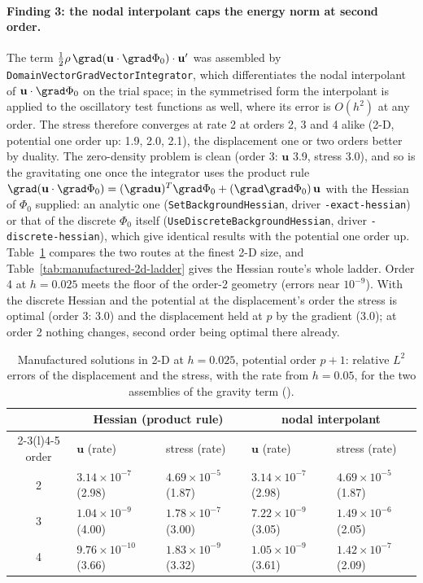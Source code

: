 \documentclass[11pt]{article}
\numberwithin{equation}{section}
\newcommand{\vu}{\mathbf{u}}
\newcommand{\code}[1]{\texttt{#1}}
\begin{document}
\paragraph{Finding 3: the nodal interpolant caps the energy norm at second
order.} The term $\tfrac12\rho\,\grad(\vu\cdot\grad\Phi_0)\cdot\vu'$ was
assembled by \code{DomainVectorGradVectorIntegrator}, which differentiates
the nodal interpolant of $\vu\cdot\grad\Phi_0$ on the trial space; in the
symmetrised form the interpolant is applied to the oscillatory test
functions as well, where its error is $O(h^2)$ at any order. The stress
therefore converges at rate 2 at orders 2, 3 and 4 alike (2-D, potential one
order up: 1.9, 2.0, 2.1), the displacement one or two orders better by
duality. The zero-density problem is clean (order 3: $\vu$ 3.9, stress
3.0), and so is the gravitating one once the integrator uses the product
rule $\grad(\vu\cdot\grad\Phi_0) = (\grad\vu)^T\grad\Phi_0 +
(\grad\grad\Phi_0)\,\vu$ with the Hessian of $\Phi_0$ supplied: an analytic
one (\code{SetBackgroundHessian}, driver \code{-exact-hessian}) or that of
the discrete $\Phi_0$ itself (\code{UseDiscreteBackgroundHessian}, driver
\code{-discrete-hessian}), which give identical results with the potential
one order up. Table~\ref{tab:manufactured-2d} compares the two routes at
the finest 2-D size, and Table~\ref{tab:manufactured-2d-ladder} gives the
Hessian route's whole ladder. Order 4 at $h=0.025$ meets the floor of the
order-2 geometry (errors near $10^{-9}$). With the discrete Hessian and the
potential at the displacement's order the stress is optimal (order 3: 3.0)
and the displacement held at $p$ by the gradient (3.0); at order 2 nothing
changes, second order being optimal there already.
\begin{table}[tp]
\centering
\small
\begin{tabular}{@{}cllll@{}}
\toprule
& \multicolumn{2}{c}{Hessian (product rule)} &
  \multicolumn{2}{c}{nodal interpolant} \\
\cmidrule(lr){2-3}\cmidrule(l){4-5}
order & $\vu$ (rate) & stress (rate) & $\vu$ (rate) & stress (rate) \\
\midrule
2 & $3.14\times10^{-7}$ (2.98) & $4.69\times10^{-5}$ (1.87)
  & $3.14\times10^{-7}$ (2.98) & $4.69\times10^{-5}$ (1.87) \\
3 & $1.04\times10^{-9}$ (4.00) & $1.78\times10^{-7}$ (3.00)
  & $7.22\times10^{-9}$ (3.05) & $1.49\times10^{-6}$ (2.05) \\
4 & $9.76\times10^{-10}$ (3.66) & $1.83\times10^{-9}$ (3.32)
  & $1.05\times10^{-9}$ (3.61) & $1.42\times10^{-7}$ (2.09) \\
\bottomrule
\end{tabular}
\caption[Manufactured solutions in 2-D: the two assemblies]{Manufactured solutions in 2-D at $h=0.025$, potential order $p+1$:
relative $L^2$ errors of the displacement and the stress, with the rate
from $h=0.05$, for the two assemblies of the gravity term
().}
\label{tab:manufactured-2d}
\end{table}
\end{document}
